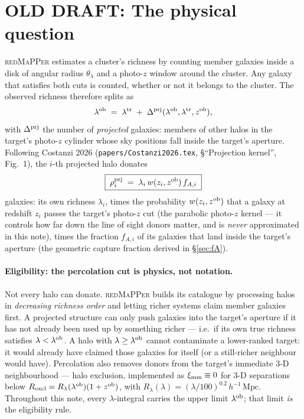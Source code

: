 \documentclass[a4paper, 11pt]{article}
\newcommand{\lob}{\lambda^{\rm ob}}
\newcommand{\ltr}{\lambda^{\rm tr}}
\newcommand{\zob}{z^{\rm ob}}
\newcommand{\dprj}{\Delta^{\rm prj}}
\newcommand{\ximm}{\xi_{\rm mm}}
\newcommand{\hMpc}{h^{-1}\,\mathrm{Mpc}}
\newcommand{\Rex}{R_{\rm excl}}
\newcommand{\rhoprj}{\rho^{\rm prj}}
\begin{document}
\iffalse
\section{OLD DRAFT: The physical question}
\label{sec:question_old}

\textsc{redMaPPer} estimates a cluster's richness by counting
member galaxies inside a disk of angular radius $\theta_\lambda$
and a photo-$z$ window around the cluster. Any galaxy that
satisfies both cuts is counted, whether or not it belongs to the
cluster. The observed richness therefore splits as
\begin{equation}
\lob \;=\; \ltr \;+\; \dprj(\lob,\ltr,\zob),
\end{equation}
with $\dprj$ the number of \emph{projected} galaxies: members of
other halos in the target's photo-$z$ cylinder whose sky positions
fall inside the target's aperture. Following Costanzi 2026
(\texttt{papers/Costanzi2026.tex}, \S``Projection kernel'',
Fig.~1), the $i$-th projected halo donates
\begin{equation}
\boxed{\;
\rhoprj_i \;=\; \lambda_i\,w(z_i,\zob)\,f_{A,i}
\;}
\label{eq:rho_prj_i}
\end{equation}
galaxies: its own richness $\lambda_i$, times the probability
$w(z_i,\zob)$ that a galaxy at redshift $z_i$ passes the target's
photo-$z$ cut (the parabolic photo-$z$ kernel --- it controls how
far down the line of sight donors matter, and is \emph{never}
approximated in this note), times the fraction $f_{A,i}$ of its
galaxies that land inside the target's aperture (the geometric
capture fraction derived in \S\ref{sec:fA}).

\paragraph{Eligibility: the percolation cut is physics, not
notation.} Not every halo can donate. \textsc{redMaPPer} builds
its catalogue by processing halos in \emph{decreasing richness
order} and letting richer systems claim member galaxies first. A
projected structure can only push galaxies into the target's
aperture if it has not already been used up by something richer
--- i.e.\ if its own true richness satisfies $\lambda<\lob$. A
halo with $\lambda\ge\lob$ cannot contaminate a lower-ranked
target: it would already have claimed those galaxies for itself
(or a still-richer neighbour would have). Percolation also
removes donors from the target's immediate 3-D neighbourhood ---
halo exclusion, implemented as $\ximm\equiv0$ for 3-D separations
below $\Rex=R_\lambda(\lob)(1+\zob)$, with
$R_\lambda(\lambda)=(\lambda/100)^{0.2}\,\hMpc$. Throughout this
note, every $\lambda$-integral carries the upper limit $\lob$;
that limit \emph{is} the eligibility rule.
\end{document}
